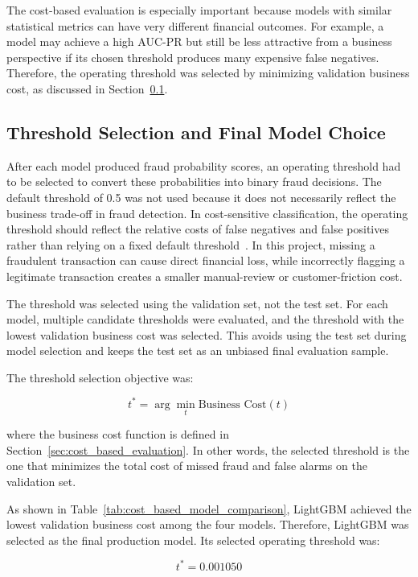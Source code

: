 The cost-based evaluation is especially important because models with similar statistical metrics can have very different financial outcomes. For example, a model may achieve a high AUC-PR but still be less attractive from a business perspective if its chosen threshold produces many expensive false negatives. Therefore, the operating threshold was selected by minimizing validation business cost, as discussed in Section~\ref{sec:threshold_selection}.

\subsection{Threshold Selection and Final Model Choice}
\label{sec:threshold_selection}

After each model produced fraud probability scores, an operating threshold had to be selected to convert these probabilities into binary fraud decisions. The default threshold of 0.5 was not used because it does not necessarily reflect the business trade-off in fraud detection. In cost-sensitive classification, the operating threshold should reflect the relative costs of false negatives and false positives rather than relying on a fixed default threshold~\cite{elkan2001foundations}. In this project, missing a fraudulent transaction can cause direct financial loss, while incorrectly flagging a legitimate transaction creates a smaller manual-review or customer-friction cost.

The threshold was selected using the validation set, not the test set. For each model, multiple candidate thresholds were evaluated, and the threshold with the lowest validation business cost was selected. This avoids using the test set during model selection and keeps the test set as an unbiased final evaluation sample.

The threshold selection objective was:

\[
t^* = \arg\min_t \text{Business Cost}(t)
\]

where the business cost function is defined in Section~\ref{sec:cost_based_evaluation}. In other words, the selected threshold is the one that minimizes the total cost of missed fraud and false alarms on the validation set.

As shown in Table~\ref{tab:cost_based_model_comparison}, LightGBM achieved the lowest validation business cost among the four models. Therefore, LightGBM was selected as the final production model. Its selected operating threshold was:

\[
t^* = 0.001050
\]

